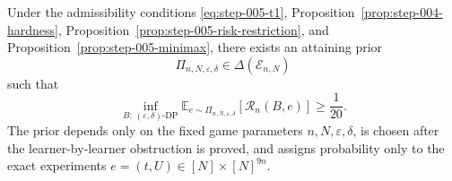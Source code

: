 \begin{proposition}
\label{prop:step-005-hard-prior}

Under the admissibility conditions \eqref{eq:step-005-t1}, Proposition~\ref{prop:step-004-hardness}, Proposition~\ref{prop:step-005-risk-restriction}, and Proposition~\ref{prop:step-005-minimax}, there exists an attaining prior
\[
\Pi_{n,N,\varepsilon,\delta}\in\Delta(\mathcal E_{n,N})
\tag{34}\label{eq:step-005-34}
\]
such that
\[
\inf_{B:\,(\varepsilon,\delta)\text{-DP}}
\mathbb E_{e\sim\Pi_{n,N,\varepsilon,\delta}}
[\mathcal R_n(B,e)]
\ge\frac1{20}.
\tag{35}\label{eq:step-005-35}
\]
The prior depends only on the fixed game parameters
\(n,N,\varepsilon,\delta\), is chosen after the learner-by-learner obstruction is proved, and assigns probability only to the exact experiments
\(e=(t,U)\in[N]\times[N]^{9n}\).

\end{proposition}

